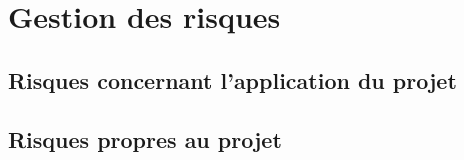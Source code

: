 \section{Gestion des risques}

\subsection{Risques concernant l'application du projet}
\subsection{Risques propres au projet}

